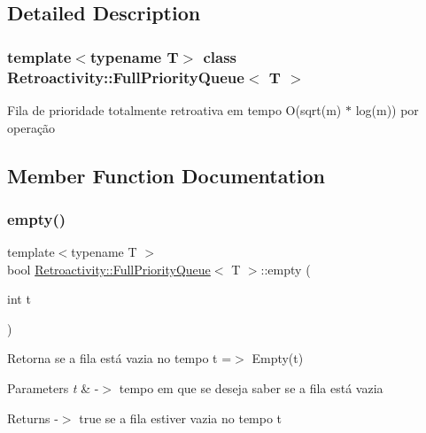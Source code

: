 \subsection{Detailed Description}
\subsubsection*{template$<$typename T$>$\newline
class Retroactivity\+::\+Full\+Priority\+Queue$<$ T $>$}

Fila de prioridade totalmente retroativa em tempo O(sqrt(m) $\ast$ log(m)) por operação 

\subsection{Member Function Documentation}
\mbox{\label{classRetroactivity_1_1FullPriorityQueue_a9e57d89b5a9a8eb5026cc9d02e1d91dc}} 
\subsubsection{\texorpdfstring{empty()}{empty()}}
{\footnotesize\ttfamily template$<$typename T $>$ \\
bool \hyperlink{classRetroactivity_1_1FullPriorityQueue}{Retroactivity\+::\+Full\+Priority\+Queue}$<$ T $>$\+::empty (\begin{DoxyParamCaption}\item[{int}]{t }\end{DoxyParamCaption})}

Retorna se a fila está vazia no tempo t =$>$ Empty(t)


\begin{DoxyParams}{Parameters}
{\em t} & -\/$>$ tempo em que se deseja saber se a fila está vazia \\
\hline
\end{DoxyParams}
\begin{DoxyReturn}{Returns}
-\/$>$ \textquotesingle{}true\textquotesingle{} se a fila estiver vazia no tempo t 
\end{DoxyReturn}
\mbox{\label{classRetroactivity_1_1FullPriorityQueue_a4dfffe327fe0f1077a2309f1b69ea392}} 
